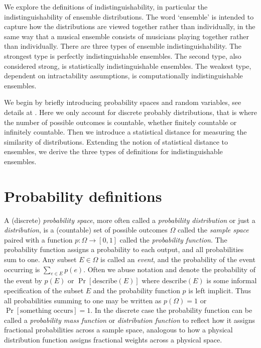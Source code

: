 
\begin{define}
    \newcommand\ppt{\text{probabilistic polynomial-time}}
\end{define}

We explore the definitions of indistinguishability, in particular the indistinguishability of ensemble distributions.
The word `ensemble' is intended to capture how the distributions are viewed together rather than individually, in the same way that a musical ensemble consists of musicians playing together rather than individually.
There are three types of ensemble indistinguishability.
The strongest type is perfectly indistinguishable ensembles.
The second type, also considered strong, is statistically indistinguishable ensembles.
The weakest type, dependent on intractability assumptions, is computationally indistinguishable ensembles.

We begin by briefly introducing probability spaces and random variables, see details at .
Here we only account for discrete probably distributions, that is where the number of possible outcomes is countable, whether finitely countable or infinitely countable.
Then we introduce a statistical distance for measuring the similarity of distributions.
Extending the notion of statistical distance to ensembles, we derive the three types of definitions for indistinguishable ensembles.


\section{Probability definitions}

A (discrete) \emph{probability space}, more often called a \emph{probability distribution} or just a \emph{distribution}, is a (countable) set of possible outcomes $\Omega$ called the \emph{sample space} paired with a function $p\colon\Omega\to[0,1]$ called the \emph{probability function}.
The probability function assigns a probability to each output, and all probabilities sum to one.
Any subset $E\in\Omega$ is called an \emph{event}, and the probability of the event occurring is $\sum_{e\in E} p(e)$.
Often we abuse notation and denote the probability of the event by $p(E)$ or $\Pr[\text{describe}(E)]$ where $\text{describe}(E)$ is some informal specification of the subset $E$ and the probability function $p$ is left implicit.
Thus all probabilities summing to one may be written as $p(\Omega)=1$ or $\Pr[\text{something occurs}]=1$.
In the discrete case the probability function can be called a \emph{probability mass function} or \emph{distribution function} to reflect how it assigns fractional probabilities across a sample space, analogous to how a physical distribution function assigns fractional weights across a physical space.


